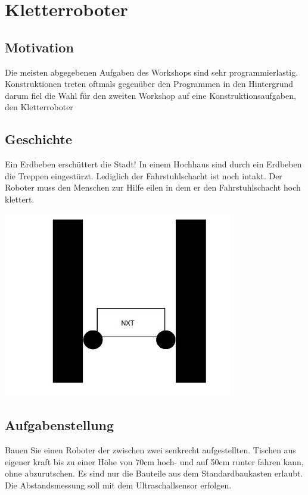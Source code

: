 \chapter{Kletterroboter}
\section{Motivation}
Die meisten abgegebenen Aufgaben des Workshops sind sehr programmierlastig. Konstruktionen treten oftmals gegenüber den Programmen in den Hintergrund darum fiel die Wahl für den zweiten Workshop auf eine Konstruktionsaufgaben, den Kletterroboter 


\section{Geschichte}
Ein Erdbeben erschüttert die Stadt! In einem Hochhaus sind durch ein Erdbeben die Treppen eingestürzt. Lediglich der Fahrstuhlschacht ist noch intakt. Der Roboter muss den Menschen zur Hilfe eilen in dem er den Fahrstuhlschacht hoch klettert.

\begin{capfigure}[Kletterroboter]
	\includegraphics[width=10cm]{images/klettern_skizze}
\end{capfigure}

\section{Aufgabenstellung}
Bauen Sie einen Roboter der zwischen zwei senkrecht aufgestellten. Tischen aus eigener kraft bis zu einer Höhe von 70cm hoch- und auf 50cm runter fahren kann, ohne abzurutschen. Es sind nur die Bauteile aus dem Standardbaukasten erlaubt. Die Abstandsmessung soll mit dem Ultraschallsensor erfolgen. 
    
